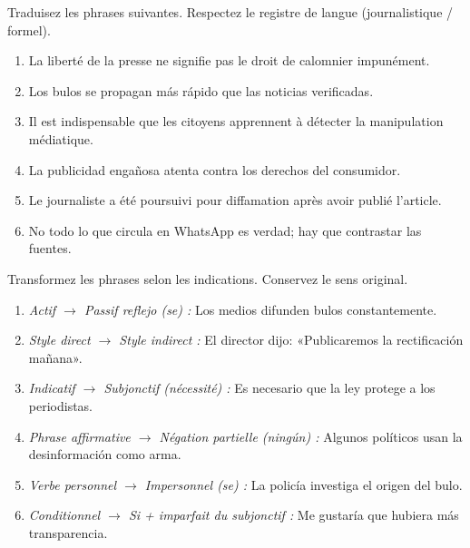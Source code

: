 \documentclass[11pt]{article}
\begin{document}
\begin{exercice}
Traduisez les phrases suivantes. Respectez le registre de langue (journalistique / formel).

\begin{enumerate}
    \item La liberté de la presse ne signifie pas le droit de calomnier impunément.
    \item Los bulos se propagan más rápido que las noticias verificadas.
    \item Il est indispensable que les citoyens apprennent à détecter la manipulation médiatique.
    \item La publicidad engañosa atenta contra los derechos del consumidor.
    \item Le journaliste a été poursuivi pour diffamation après avoir publié l'article.
    \item No todo lo que circula en WhatsApp es verdad; hay que contrastar las fuentes.
\end{enumerate}
\end{exercice}

\begin{exercice}
Transformez les phrases selon les indications. Conservez le sens original.

\begin{enumerate}
    \item \emph{Actif $\rightarrow$ Passif reflejo (se) :} Los medios difunden bulos constantemente.
    \item \emph{Style direct $\rightarrow$ Style indirect :} El director dijo: «Publicaremos la rectificación mañana».
    \item \emph{Indicatif $\rightarrow$ Subjonctif (nécessité) :} Es necesario que la ley protege a los periodistas.
    \item \emph{Phrase affirmative $\rightarrow$ Négation partielle (ningún) :} Algunos políticos usan la desinformación como arma.
    \item \emph{Verbe personnel $\rightarrow$ Impersonnel (se) :} La policía investiga el origen del bulo.
    \item \emph{Conditionnel $\rightarrow$ Si + imparfait du subjonctif :} Me gustaría que hubiera más transparencia.
\end{enumerate}
\end{exercice}
\end{document}
